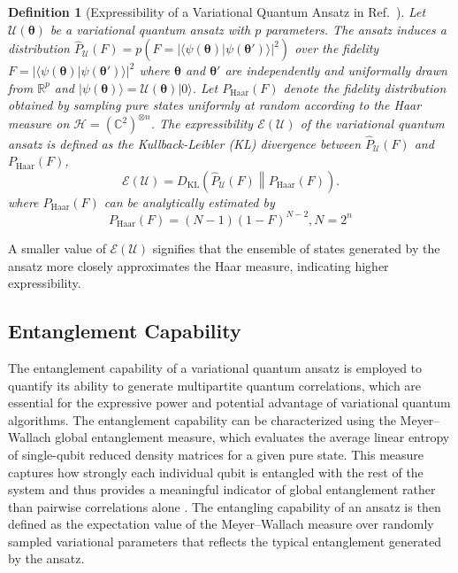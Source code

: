 \documentclass[twocolumn,
pra,aps,superscriptaddress,showpacs,amsmath,amssymb]{revtex4-2}
\newtheorem{definition}{Definition}
\begin{document}
\begin{definition}[Expressibility of a Variational Quantum Ansatz in Ref.~\cite{sim2019expressibility}]
Let $\mathcal{U}(\bm{\theta})$ be a variational quantum ansatz with $p$ parameters. The ansatz induces a distribution $\hat{P}_{\mathcal{U}}(F)=p(F = |\langle \psi(\bm{\theta})| \psi(\bm{\theta}') \rangle|^2)$ over the fidelity $F = |\langle \psi(\bm{\theta})| \psi(\bm{\theta}') \rangle|^2$
where $\bm{\theta}$ and $\bm{\theta}'$ are independently and uniformally drawn from $\mathbb{R}^p$ and $|\psi(\bm{\theta})\rangle = \mathcal{U}(\bm{\theta}) |0\rangle$.
Let $P_{\mathrm{Haar}}(F)$ denote the fidelity distribution obtained by sampling pure states uniformly at random according to the Haar measure on $\mathcal{H} = (\mathbb{C}^2)^{\otimes n}$.  
The expressibility $\mathcal{E}(\mathcal{U})$ of the variational quantum ansatz is defined as the Kullback-Leibler (KL) divergence between $\hat{P}_{\mathcal{U}}(F)$ and $P_{\mathrm{Haar}}(F)$,
\begin{equation}
\mathcal{E}(\mathcal{U})=D_{\mathrm{KL}}\!\left(
\hat{P}_{\mathcal{U}}(F)\middle\|P_{\mathrm{Haar}}(F)\right).
\end{equation}
where $P_{\mathrm{Haar}}(F)$ can be analytically estimated by
\begin{equation}
    P_{\mathrm{Haar}}(F)= (N-1)(1-F)^{N-2}, N=2^n
\end{equation}
\end{definition}
A smaller value of $\mathcal{E}(\mathcal{U})$ signifies that the ensemble of states generated by the ansatz more closely approximates the Haar measure, indicating higher expressibility.

\subsection{Entanglement Capability}
The entanglement capability of a variational quantum ansatz is employed to quantify its ability to generate multipartite quantum correlations, which are essential for the expressive power and potential advantage of variational quantum algorithms. The entanglement capability can be characterized using the Meyer–Wallach global entanglement measure, which evaluates the average linear entropy of single-qubit reduced density matrices for a given pure state. This measure captures how strongly each individual qubit is entangled with the rest of the system and thus provides a meaningful indicator of global entanglement rather than pairwise correlations alone \cite{meyer2001global}. The entangling capability of an ansatz is then defined as the expectation value of the Meyer–Wallach measure over randomly sampled variational parameters that reflects the typical entanglement generated by the ansatz. 
\end{document}

